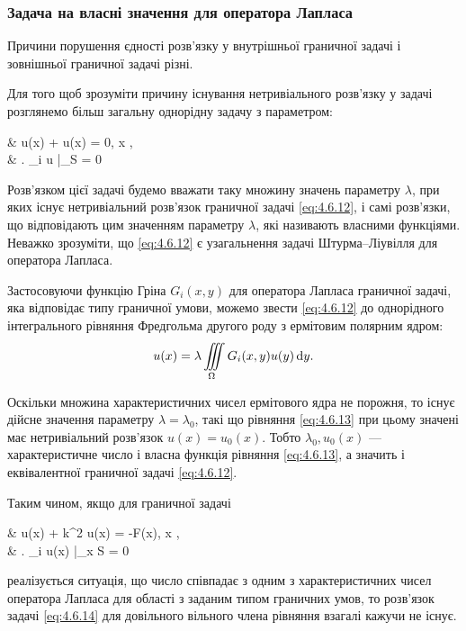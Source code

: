 \subsubsection{Задача на власні значення для оператора Лапласа}

Причини порушення єдності розв'язку у внутрішньої граничної задачі  і зовнішньої граничної задачі  різні. \medskip

Для того щоб зрозуміти причину існування нетривіального розв'язку у задачі  розглянемо більш загальну однорідну задачу з параметром:
\begin{system}
	\label{eq:4.6.12}
	& \Delta u(x) + \lambda u(x) = 0, \quad x \in \Omega, \\
	& \left. \ell_i u \right|_S = 0
\end{system}

Розв'язком цієї задачі будемо вважати таку множину значень параметру $\lambda$, при яких існує нетривіальний розв'язок граничної задачі \eqref{eq:4.6.12}, і самі розв'язки, що відповідають цим значенням параметру $\lambda$, які називають власними функціями. Неважко зрозуміти, що \eqref{eq:4.6.12} є узагальнення задачі Штурма--Ліувілля для оператора Лапласа. \medskip

Застосовуючи функцію Гріна $G_i(x, y)$ для оператора Лапласа граничної задачі, яка відповідає типу граничної умови, можемо звести \eqref{eq:4.6.12} до однорідного інтегрального рівняння Фредгольма другого роду з ермітовим полярним ядром:
\begin{equation}
	\label{eq:4.6.13}
	u(x) = \lambda \displaystyle\iiint\limits_\Omega G_i(x, y) u(y) \mathop{}\!\mathrm{d} y.
\end{equation}

Оскільки множина характеристичних чисел ермітового ядра не порожня, то існує дійсне значення параметру $\lambda = \lambda_0$, такі що рівняння \eqref{eq:4.6.13} при цьому значені має нетривіальний розв'язок $u(x) = u_0(x)$. Тобто $\lambda_0, u_0(x)$ --- характеристичне число і власна функція рівняння \eqref{eq:4.6.13}, а значить і еквівалентної граничної задачі \eqref{eq:4.6.12}. \medskip

Таким чином, якщо для граничної задачі
\begin{system}
	\label{eq:4.6.14}
	& \Delta u(x) + k^2 u(x) = -F(x), \quad x \in \Omega, \\
	& \left. \ell_i u(x) \right|_{x \in S} = 0
\end{system}
реалізується ситуація, що число   співпадає з одним з характеристичних чисел оператора Лапласа для області   з заданим типом граничних умов, то розв'язок задачі \eqref{eq:4.6.14} для довільного вільного члена рівняння взагалі кажучи не існує. \medskip

